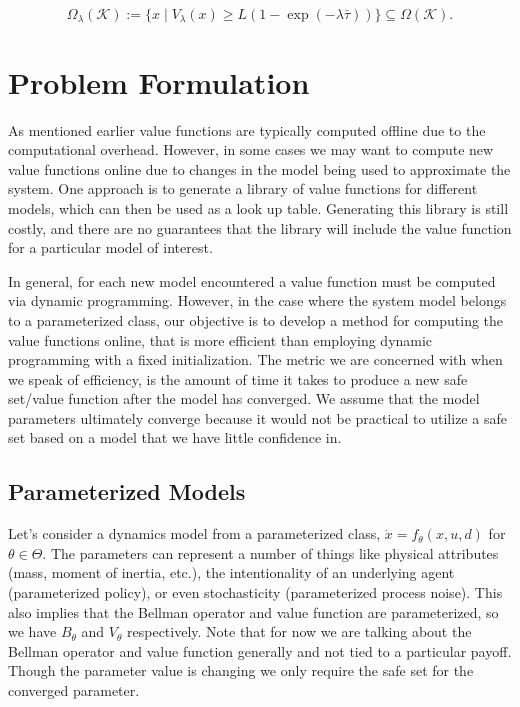 \documentclass{journal}
\newcommand{\K}{\mathcal{K}}
\begin{document}
\begin{equation} \label{eq:safe_set_lambda}
\Omega_{\lambda}(\K) := \{x \mid V_{\lambda}(x) \ge L( 1 -  \exp(-\lambda \bar{\tau})) \} \subseteq \Omega(\K).
\end{equation}  

\section{Problem Formulation}
As mentioned earlier value functions are typically computed offline due to the computational overhead. However, in some cases we may want to compute new value functions online due to changes in the model being used to approximate the system. One approach is to generate a library of value functions for different models, which can then be used as a look up table. Generating this library is still costly, and there are no guarantees that the library will include the value function for a particular model of interest.

In general, for each new model encountered  a value function must be computed via dynamic programming. However, in the case where the system model belongs to a parameterized class, our objective is to develop a method for computing the value functions online, that is more efficient than employing dynamic programming with a fixed initialization. The metric we are concerned with when we speak of efficiency, is the amount of time it takes to produce a new safe set/value function after the model has converged. We assume that the model parameters ultimately converge because it would not be practical to utilize a safe set based on a model that we have little confidence in.

\subsection{Parameterized Models}
Let's consider a dynamics model from a  parameterized class, $\dot{x}=f_{\theta}(x,u,d)$ for $\theta \in \Theta$. The parameters can represent a number of things like physical attributes (mass, moment of inertia, etc.), the intentionality of an underlying agent (parameterized policy), or even stochasticity (parameterized process noise). This also implies that the Bellman operator and value function are parameterized, so we have $B_\theta$ and $V_\theta$ respectively. Note that for now we are talking about the Bellman operator and value function generally and not tied to a particular payoff. Though the parameter value is changing we only require the safe set for the converged parameter.
\end{document}
